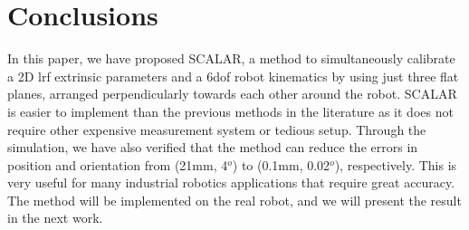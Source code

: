 \section{Conclusions}
\label{sec:conclusions}

In this paper, we have proposed SCALAR, a method to simultaneously calibrate a 2D \ac{lrf} extrinsic parameters and a 6\ac{dof} robot kinematics by using just three flat planes, arranged perpendicularly towards each other around the robot. SCALAR is easier to implement than the previous methods in the literature as it does not require other expensive measurement system or tedious setup. Through the simulation, we have also verified that the method can reduce the errors in position and orientation from (21mm, 4$^o$) to (0.1mm, 0.02$^o$), respectively. This is very useful for many industrial robotics applications that require great accuracy. The method will be implemented on the real robot, and we will present the result in the next work. 
